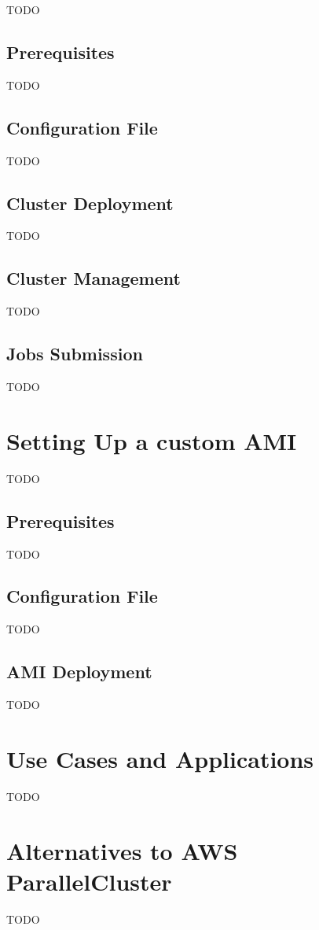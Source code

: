TODO

\subsection{Prerequisites}

TODO

\subsection{Configuration File}

TODO

\subsection{Cluster Deployment}

TODO

\subsection{Cluster Management}

TODO

\subsection{Jobs Submission}

TODO

\section{Setting Up a custom AMI}

TODO

\subsection{Prerequisites}

TODO

\subsection{Configuration File}

TODO

\subsection{AMI Deployment}

TODO

\section{Use Cases and Applications}

TODO

\section{Alternatives to AWS ParallelCluster}

TODO

